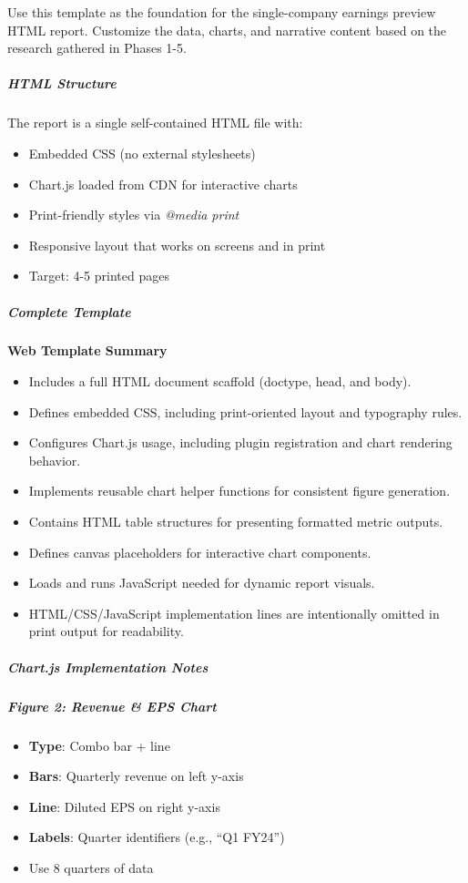 \documentclass[11pt]{article}
\begin{document}
Use this template as the foundation for the single-company earnings preview HTML report. Customize the data, charts, and narrative content based on the research gathered in Phases 1-5.


\subparagraph{HTML Structure}\mbox{}\par

The report is a single self-contained HTML file with:

\begin{itemize}[leftmargin=*,itemsep=2pt,topsep=2pt]
\item {} Embedded CSS (no external stylesheets)
\item {} Chart.js loaded from CDN for interactive charts
\item {} Print-friendly styles via \emph{@media print}
\item {} Responsive layout that works on screens and in print
\item {} Target: 4-5 printed pages
\end{itemize}

\subparagraph{Complete Template}\mbox{}\par

\textbf{Web Template Summary}
\begin{itemize}[leftmargin=*,itemsep=2pt,topsep=2pt]
\item {} Includes a full HTML document scaffold (doctype, head, and body).
\item {} Defines embedded CSS, including print-oriented layout and typography rules.
\item {} Configures Chart.js usage, including plugin registration and chart rendering behavior.
\item {} Implements reusable chart helper functions for consistent figure generation.
\item {} Contains HTML table structures for presenting formatted metric outputs.
\item {} Defines canvas placeholders for interactive chart components.
\item {} Loads and runs JavaScript needed for dynamic report visuals.
\item {} HTML/CSS/JavaScript implementation lines are intentionally omitted in print output for readability.
\end{itemize}

\subparagraph{Chart.js Implementation Notes}\mbox{}\par

\subparagraph{Figure 2: Revenue \& EPS Chart}\mbox{}\par
\begin{itemize}[leftmargin=*,itemsep=2pt,topsep=2pt]
\item {} \textbf{Type}: Combo bar + line
\item {} \textbf{Bars}: Quarterly revenue on left y-axis
\item {} \textbf{Line}: Diluted EPS on right y-axis
\item {} \textbf{Labels}: Quarter identifiers (e.g., ``Q1 FY24'')
\item {} Use 8 quarters of data
\end{itemize}
\end{document}
